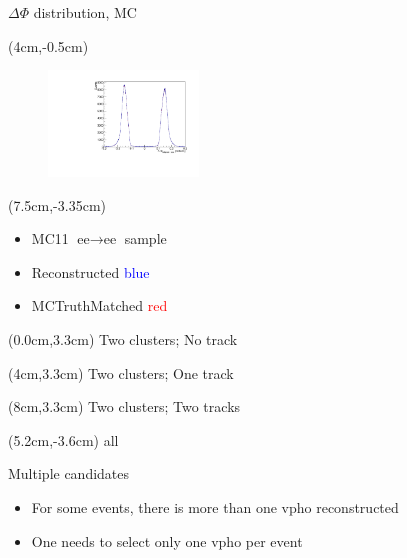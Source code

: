 \documentclass[10pt]{beamer}
\begin{document}
{\begin{frame}{$\Delta \Phi$ distribution, MC}
\begin{textblock*}{\textwidth}
	\end{textblock*}	

\begin{textblock*}{\textwidth}(4cm,-0.5cm)
	\begin{figure}
		\includegraphics[width=4cm]{Plots/MCee}
	\end{figure}
	
\end{textblock*}	

\begin{textblock*}{\textwidth}(7.5cm,-3.35cm)
	\begin{itemize}
		\item MC11 $\textrm{ee} \rightarrow \textrm{ee}$ sample
		\item Reconstructed \textcolor{blue}{blue}
		\item MCTruthMatched \textcolor{red}{red}
	\end{itemize}
	
\end{textblock*}

\begin{textblock*}{0.2\textwidth}(0.0cm,3.3cm)
 Two clusters; No track
\end{textblock*}

\begin{textblock*}{0.2\textwidth}(4cm,3.3cm)
	Two clusters; One track
\end{textblock*}

\begin{textblock*}{0.2\textwidth}(8cm,3.3cm)
	Two clusters; Two tracks
\end{textblock*}


\begin{textblock*}{\textwidth}(5.2cm,-3.6cm)
	all
\end{textblock*}


\end{frame}



\begin{frame}{Multiple candidates}
	
	\begin{itemize}
		\item For some events, there is more than one vpho reconstructed
		\item One needs to select only one vpho per event
	\end{itemize}
	

\end{frame}}
\end{document}
